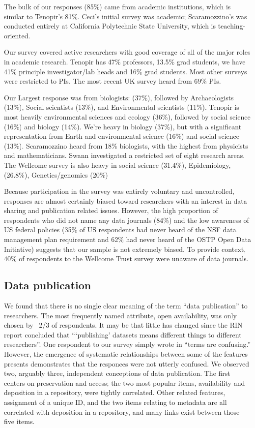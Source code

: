 \documentclass[10pt]{article}
\begin{document}
The bulk of our responses (85\%) came from academic institutions, which is similar to Tenopir's 81\%.  
Ceci's initial survey was academic\cite{ceci_scientists_1988}; Scaramozzino's was conducted entirely at California Polytechnic State University, which is teaching-oriented\cite{scaramozzino_study_2012}. 

Our survey covered active researchers with good coverage of all of the major roles in academic research.
Tenopir has 47\% professors, 13.5\% grad students, we have 41\% principle investigator/lab heads and 16\% grad students.
Most other surveys were restricted to PIs.
The most recent UK survey heard from 69\% PIs\cite{bobrow_establishing_2014}.

Our Largest response was from biologists: (37\%), followed by Archaeologists (13\%), Social scientists (13\%), and Environmental scientists (11\%). 
Tenopir is most heavily environmental sciences and ecology (36\%), followed by social science (16\%) and biology (14\%). 
We're heavy in biology (37\%), but with a significant representation from Earth and environmental science (16\%) and social science (13\%). 
Scaramozzino heard from 18\% biologists, with the highest from physicists and mathematicians.
Swann investigated a restricted set of eight research areas.
The Wellcome survey is also heavy in social science (31.4\%), Epidemiology, (26.8\%), Genetics/genomics (20\%)

Because participation in the survey was entirely voluntary and uncontrolled, responses are almost certainly biased toward researchers with an interest in data sharing and publication related issues.
However, the high proportion of respondents who did not name any data journals (84\%) and the low awareness of US federal policies (35\% of US respondents had never heard of the NSF data management plan requirement and 62\% had never heard of the OSTP Open Data Initiative) suggests that our sample is not extremely biased.
To provide context, 40\% of respondents to the Wellcome Trust survey were unaware of data journals.


\subsection*{Data publication}

We found that there  is no single clear meaning of the term ``data publication'' to researchers.
The most frequently named attribute, open availability, was only chosen by ~2/3 of respondents.
It may be that little has changed since the RIN report concluded that ```publishing' datasets means different things to different researchers''\cite{swan_share_2008}.
One respondent to our survey simply wrote in ``terms are confusing.''
However, the emergence of systematic relationships between some of the features presents demonstrates that the responces were not utterly confused.
We observed two, arguably three, independent conceptions of data publication.
The first centers on preservation and access; the two most popular items, availability and deposition in a repository, were tightly correlated.
Other related features, assignment of a unique ID, and the two items relating to metadata are all correlated with deposition in a repository, and many links exist between those five items.
\end{document}
